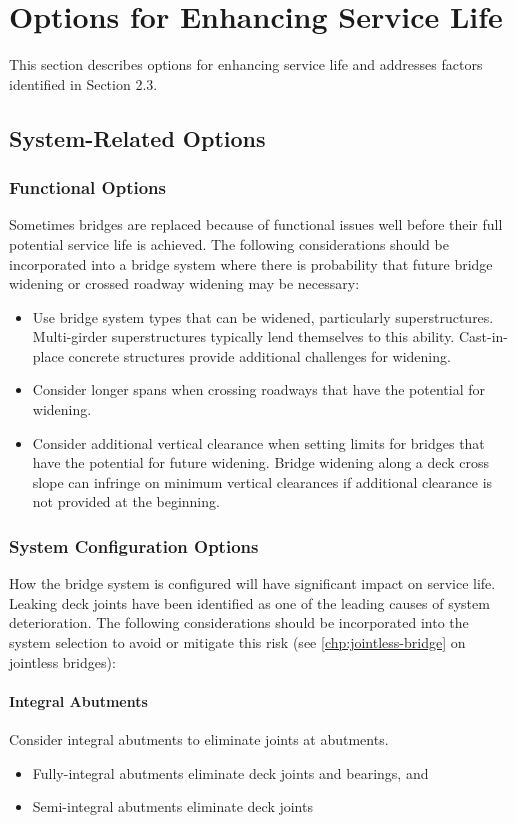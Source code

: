 \section{Options for Enhancing Service Life}\label{sec:options-enhance-sl}
This section describes options for enhancing service life and addresses factors identified in Section 2.3.

\subsection{System-Related Options}
\subsubsection{Functional Options}
Sometimes bridges are replaced because of functional issues well before their full potential service life is
achieved. The following considerations should be incorporated into a bridge system where there is probability that
future bridge widening or crossed roadway widening may be necessary:
\begin{itemize}
  \item Use bridge system types that can be widened, particularly superstructures. Multi-girder superstructures
  typically lend themselves to this ability. Cast-in-place concrete structures provide additional challenges for
  widening.
  \item  Consider longer spans when crossing roadways that have the potential for widening.
  \item Consider additional vertical clearance when setting limits for bridges that have the potential for future
  widening. Bridge widening along a deck cross slope can infringe on minimum vertical clearances if
  additional clearance is not provided at the beginning.
\end{itemize}

\subsubsection{System Configuration Options}
How the bridge system is configured will have significant impact on service life. Leaking deck joints have been
identified as one of the leading causes of system deterioration. The following considerations should be incorporated
into the system selection to avoid or mitigate this risk (see \cref{chp:jointless-bridge} on jointless bridges):
\paragraph{Integral Abutments}
Consider integral abutments to eliminate joints at abutments.
\begin{itemize}
  \item Fully-integral abutments eliminate deck joints and bearings, and
  \item Semi-integral abutments eliminate deck joints
\end{itemize}

